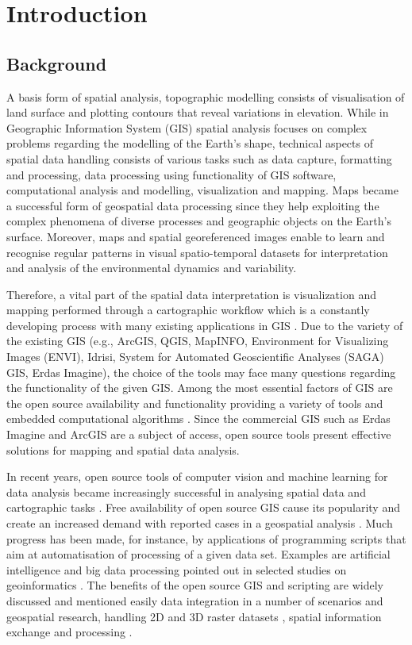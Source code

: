 \documentclass[technologies,article,submit,pdftex,moreauthors]{Definitions/mdpi}
\begin{document}
\section{Introduction}

\subsection{Background}
A basis form of spatial analysis, topographic modelling consists of visualisation of land surface and plotting contours that reveal variations in elevation. While in Geographic Information System (GIS) spatial analysis  focuses on complex problems regarding the modelling of the Earth's shape, technical aspects of spatial data handling consists of various tasks such as data capture, formatting and processing, data processing using functionality of GIS software, computational analysis and modelling, visualization and mapping. Maps became a successful form of geospatial data processing  since they help exploiting the complex phenomena of diverse processes and geographic objects on the Earth's surface. Moreover, maps and spatial georeferenced images enable to learn and recognise regular patterns in visual spatio-temporal datasets for interpretation and analysis of the environmental dynamics and variability.

Therefore, a vital part of the spatial data interpretation is visualization and mapping performed through a cartographic workflow which is a constantly developing process with many existing applications in GIS  \cite{Boulton,Buterez,Duncan}. Due to the variety of the existing GIS (e.g., ArcGIS, QGIS, MapINFO, Environment for Visualizing Images (ENVI), Idrisi, System for Automated Geoscientific Analyses (SAGA) GIS, Erdas Imagine), the choice of the tools may face many questions regarding the functionality of the given GIS. Among the most essential factors of GIS are the open source availability and functionality providing a variety of tools and embedded computational algorithms \cite{Armstrong}. Since the commercial GIS such as Erdas Imagine and ArcGIS are a subject of access, open source tools present effective solutions for mapping and spatial data analysis. 

In recent years, open source tools of computer vision and machine learning for data analysis became increasingly successful in analysing spatial data and cartographic tasks \cite{Brovelli}. Free availability of open source GIS cause its popularity and create an increased demand with reported cases in a geospatial analysis \cite{Christl,Turton}. Much progress has been made, for instance, by applications of programming scripts  that aim at automatisation of processing of a given data set. Examples are artificial intelligence and big data processing pointed out in selected studies on geoinformatics \cite{Barnes,Issaka}. The benefits of the open source GIS and scripting are widely discussed and mentioned easily data integration in a number of scenarios and geospatial research, handling 2D and 3D raster datasets \cite{land12010261}, spatial information exchange and processing \cite{Ajvazi,Guan,Kralidis}. 
\end{document}

